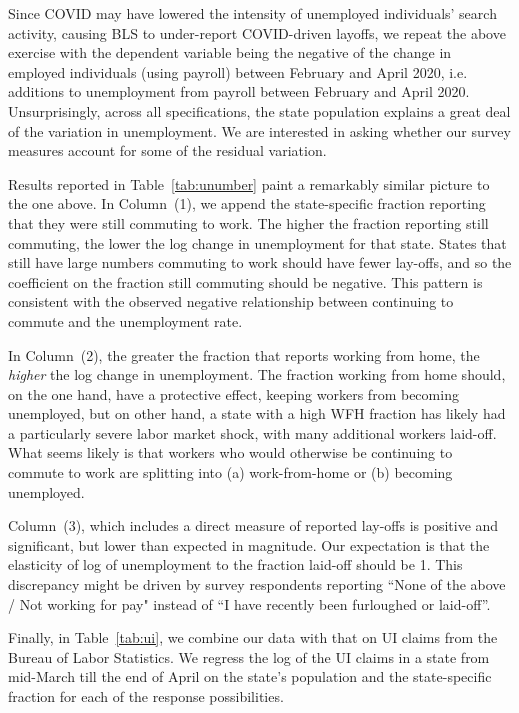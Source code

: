 \documentclass[12pt]{article}
\begin{document}


Since COVID may have lowered the intensity of unemployed individuals' search activity, causing BLS to under-report COVID-driven layoffs, we repeat the above exercise with the dependent variable being the negative of the change in employed individuals (using payroll) between February and April 2020, i.e. additions to unemployment from payroll between February and April 2020. Unsurprisingly, across all specifications, the state population explains a great deal of the variation in unemployment. We are interested in asking whether our survey measures account for some of the residual variation. 

Results reported in Table~\ref{tab:unumber} paint a remarkably similar picture to the one above. In Column~(1), we append the state-specific fraction reporting that they were still commuting to work.
The higher the fraction reporting still commuting, the lower the log change in unemployment for that state.
States that still have large numbers commuting to work should have fewer lay-offs, and so the coefficient on the fraction still commuting should be negative. This pattern is consistent with the observed negative relationship between continuing to commute and the unemployment rate.

In Column~(2), the greater the fraction that reports working from home, the \emph{higher} the log change in unemployment. The fraction working from home should, on the one hand, have a protective effect, keeping workers from becoming unemployed, but on other hand, a state with a high WFH fraction has likely had a particularly severe labor market shock, with many additional workers laid-off. What seems likely is that workers who would otherwise be continuing to commute to work are splitting into (a) work-from-home or (b) becoming unemployed.

Column~(3), which includes a direct measure of reported lay-offs is positive and significant, but lower than expected in magnitude. Our expectation is that the elasticity of log of unemployment to the fraction laid-off should be 1. This discrepancy might be driven by survey respondents reporting ``None of the above / Not working for pay" instead of ``I have recently been furloughed or laid-off''.



Finally, in Table~\ref{tab:ui}, we combine our data with that on UI claims from the Bureau of Labor Statistics. We regress the log of the UI claims in a state from mid-March till the end of April on the state's population and the state-specific fraction for each of the response possibilities.  
\end{document}
